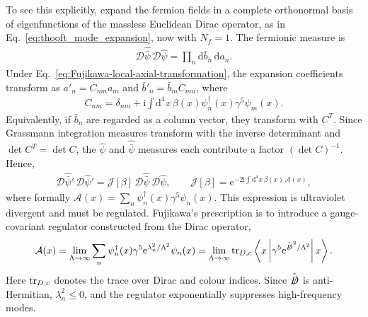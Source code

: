 \documentclass[review]{elsarticle}
\numberwithin{equation}{section}
\numberwithin{table}{section}
\numberwithin{figure}{section}
\def\d{\mathrm{d}}
\def\i{\mathrm{i}}
\def\e{\mathrm{e}}
\begin{document}
To see this explicitly, expand the fermion fields in a complete orthonormal basis of eigenfunctions of the massless Euclidean Dirac operator, as in Eq.~\eqref{eq:thooft_mode_expansion}, now with $N_f=1$. The fermionic measure is
\begin{align}
    \mathcal D\hat{\bar\psi}\,\mathcal D\hat\psi
    = \prod_n \d\bar b_n\,\d a_n.
\end{align}
Under Eq.~\eqref{eq:Fujikawa-local-axial-transformation}, the expansion coefficients transform as $a'_n=C_{nm}a_m$ and $\bar b'_n=\bar b_m C_{mn}$, where
\begin{align}
    C_{nm} = \delta_{nm} + \i \int\d^4x\, \beta(x) \psi_n^\dagger(x) \gamma^5 \psi_m(x).
    \label{eq:Fujikawa-transformation-matrix}
\end{align}
Equivalently, if $\bar b_n$ are regarded as a column vector, they transform with $C^T$. Since Grassmann integration measures transform with the inverse determinant and $\det C^T=\det C$, the $\hat\psi$ and $\hat{\bar\psi}$ measures each contribute a factor $(\det C)^{-1}$. Hence,
\begin{align}
    \mathcal D\hat{\bar\psi}'\, \mathcal D\hat\psi'
    = \mathcal J[\beta]\, \mathcal D\hat{\bar\psi}\, \mathcal D\hat\psi,
    \qquad
    \mathcal J[\beta] = \e^{-2\i\int\d^4x\,\beta(x)\,\mathcal A(x)},
    \label{eq:Fujikawa-Jacobian}
\end{align}
where formally $\mathcal A(x)=\sum_n\psi_n^\dagger(x)\gamma^5\psi_n(x)$. This expression is ultraviolet divergent and must be regulated. Fujikawa's prescription is to introduce a gauge-covariant regulator constructed from the Dirac operator,
\begin{align}
    \mathcal A(x) 
    = \lim_{\Lambda\rightarrow\infty}
    \sum_n \psi_n^\dagger(x) \gamma^5 \e^{\lambda_n^{2}/\Lambda^2} \psi_n(x)
    = 
    \lim_{\Lambda\rightarrow\infty}{\rm tr}_{D,c}
    \left\langle x\left| \gamma^5 \e^{\hat{\slashed{D}}^{2}/\Lambda^2}
    \right|x\right\rangle .
    \label{eq:Fujikawa-regulated-trace}
\end{align}
Here ${\rm tr}_{D,c}$ denotes the trace over Dirac and colour indices. Since $\hat{\slashed{D}}$ is anti-Hermitian, $\lambda_n^2\leq0$, and the regulator exponentially suppresses high-frequency modes.
\end{document}
